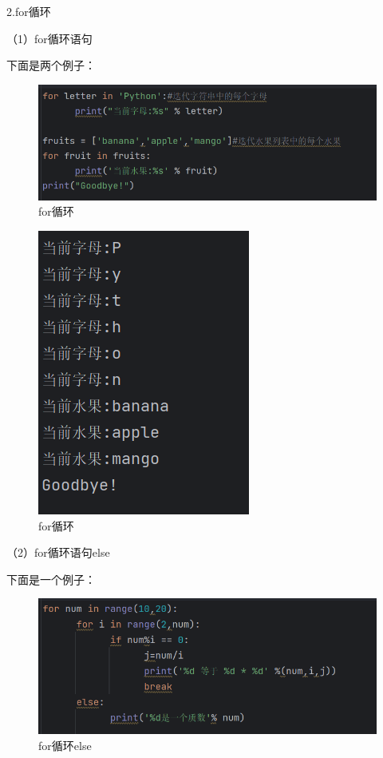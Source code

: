 \documentclass{ctexart}
\begin{document}
	2.for循环
	
	（1）for循环语句
	
	下面是两个例子：
	
	\begin{figure}[H]
		\centering
		\includegraphics[scale=0.5]{3.19}
		\caption{for循环}
	\end{figure}
	
	\begin{figure}[H]
		\centering
		\includegraphics[scale=0.5]{3.20}
		\caption{for循环}
	\end{figure}
	
	（2）for循环语句else
	
	下面是一个例子：
	
	\begin{figure}[H]
		\centering
		\includegraphics[scale=0.5]{3.21}
		\caption{for循环else}
	\end{figure}
	
\end{document}
